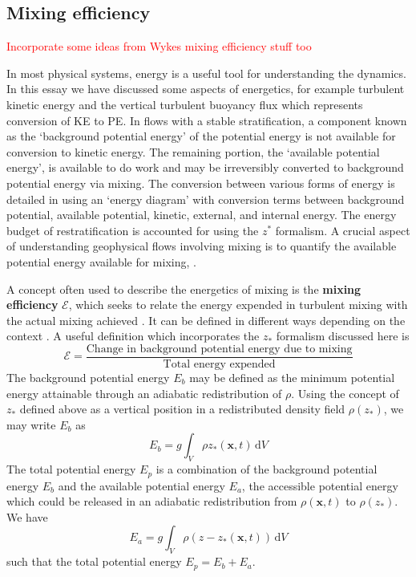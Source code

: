 \documentclass[a4paper]{article}
\begin{document}
\subsection{Mixing efficiency}
\label{sec:energetics}
\textcolor{red}{Incorporate some ideas from Wykes mixing efficiency stuff too}

In most physical systems, energy is a useful tool for understanding the dynamics. In this essay we have
discussed some aspects of energetics, for example turbulent kinetic energy and the vertical turbulent buoyancy
flux which represents conversion of KE to PE. In flows with a stable stratification, a component known as the
`background potential energy' of the potential energy is not available for conversion to kinetic energy. The
remaining portion, the `available potential energy', is available to do work and may be irreversibly converted
to background potential energy via mixing. The conversion between various forms of energy is
detailed in \citet{winters1995} using an `energy diagram' with conversion terms between background
potential, available potential, kinetic, external, and internal energy. The energy budget of restratification
is accounted for using the $z^*$ formalism. A crucial aspect of understanding geophysical flows involving
mixing is to quantify the available potential energy available for mixing, . 

A concept often used to describe the energetics of mixing is the \textbf{mixing efficiency} $\mathcal{E}$,
which seeks to relate the energy expended in turbulent mixing with the actual mixing achieved
\citep{wykes2015}. It can be defined in different ways depending on the context \citep{gregg2018}. A useful
definition which incorporates the $z_*$ formalism discussed here is
\begin{equation}
	\mathcal{E} = \frac{\text{Change in background potential energy due to mixing}}{\text{Total energy expended}}
\end{equation}
The background potential energy $E_b$ may be defined as the minimum potential energy attainable through an
adiabatic redistribution of $\rho$. Using the concept of $z_*$ defined above as a vertical position in a
redistributed density field $\rho(z_*)$, we may write $E_b$ as
\begin{equation}
	E_b = g \int_V \rho z_*(\bm{x},t)\,\mathrm{d}V
\end{equation}
The total potential energy $E_p$ is a combination of the background potential energy $E_b$ and the
available potential energy $E_a$, the accessible potential energy which could be released in an adiabatic
redistribution from $\rho(\bm{x},t)$ to $\rho(z_*)$. We have
\begin{equation}
	E_a = g \int_V \rho \left(z-z_*(\bm{x},t)\right)\,\mathrm{d}V
\end{equation}
such that the total potential energy $E_p = E_b + E_a$. 
\end{document}

